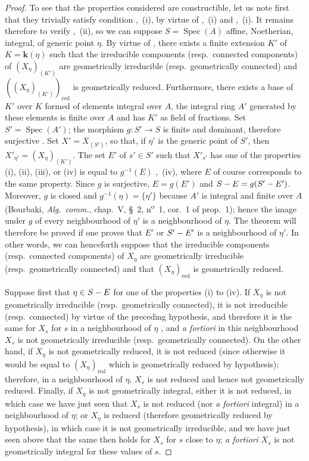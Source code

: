\begin{proof}
To see that the properties considered are constructible, let us note first that they trivially satisfy condition ,~(i), by virtue of ,~(i) and ,~(i).
It remains therefore to verify ,~(ii), so we can suppose $S=\operatorname{Spec}(A)$ affine, Noetherian, integral, of generic point $\eta$.
By virtue of , there exists a finite extension $K'$ of $K=\boldsymbol{k}(\eta)$ such that the irreducible components (resp.\ connected components) of $(X_\eta)_{(K')}$ are geometrically irreducible (resp.\ geometrically connected) and $((X_\eta)_{(K')})_\mathrm{red}$ is geometrically reduced.
Furthermore, there exists a base of $K'$ over $K$ formed of elements integral over $A$, the integral ring $A'$ generated by these elements is finite over $A$ and has $K'$ as field of fractions.
Set $S'=\operatorname{Spec}(A')$; the morphism $g:S'\to S$ is finite and dominant, therefore surjective . Set $X'=X_{(S')}$, so that, if $\eta'$ is the generic point of $S'$, then $X'_{\eta'}=(X_\eta)_{(K')}$. The set $E'$ of $s'\in S'$ such that $X'_{s'}$ has one of the properties (i), (ii), (iii), or (iv) is equal to $g^{-1}(E)$ ,~(iv), where $E$ of course corresponds to the same property. Since $g$ is surjective, $E=g(E')$ and $S- E=g(S'- E')$. Moreover, $g$ is closed and $g^{-1}(\eta)=\{\eta'\}$ because $A'$ is integral and finite over $A$ (Bourbaki, \emph{Alg.\ comm.}, chap.\ V, \S~2, n\textsuperscript{o}~1, cor.\ 1 of prop.\ 1); hence the image under $g$ of every neighbourhood of $\eta'$ is a neighbourhood of $\eta$.
The theorem will therefore be proved if one proves that $E'$ or $S'- E'$ is a neighbourhood of $\eta'$.
In other words, we can henceforth suppose that the irreducible components (resp.\ connected components) of $X_\eta$ are geometrically
irreducible (resp.\ geometrically connected) and that $(X_\eta)_\mathrm{red}$ is geometrically reduced.

Suppose first that $\eta\in S- E$ for one of the properties (i) to (iv).
If $X_\eta$ is not geometrically irreducible (resp.\ geometrically connected), it is not irreducible (resp.\ connected) by virtue of the preceding hypothesis, and therefore it is the same for $X_s$ for $s$ in a neighbourhood of $\eta$ , and \emph{a fortiori} in this neighbourhood $X_s$ is not geometrically irreducible (resp.\ geometrically connected).
On the other hand, if $X_\eta$ is not geometrically reduced, it is not reduced (since otherwise it would be equal to $(X_\eta)_\mathrm{red}$ which is geometrically reduced by hypothesis); therefore, in a neighbourhood of $\eta$, $X_s$ is not reduced  and hence not geometrically reduced.
Finally, if $X_\eta$ is not geometrically integral, either it is not reduced, in which case we have just seen that $X_s$ is not reduced (nor \emph{a fortiori} integral) in a neighbourhood of $\eta$; or $X_\eta$ is reduced (therefore geometrically reduced by hypothesis), in which case it is not geometrically irreducible, and we have just seen above that the same then holds for $X_s$ for $s$ close to $\eta$; \emph{a fortiori} $X_s$ is not geometrically integral for these values of $s$.


\end{proof}
